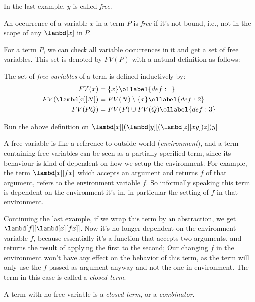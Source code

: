 \documentclass[../../../include/open-logic-section]{subfiles}
\begin{document}
In the last example, $y$ is called \emph{free}. 
\begin{defn}
  An occurrence of a variable $x$ in a term $P$ is \emph{free} if it's not bound, i.e., not in the scope of any
  $\lambd[x]$ in $P$.
\end{defn}


For a term $P$, we can check all variable occurrences in it and get a set of free
variables. This set is denoted by $FV(P)$ with a natural definition
as follows:

\begin{defn} 
  The set of \emph{free variables} of a term is defined inductively by:
  \begin{align} 
    FV(x) &= \{x\} \ollabel{def:1} \\
    FV(\lambd[x][N]) &= FV(N) \setminus \{x\}    \ollabel{def:2} \\
    FV(PQ) &= FV(P) \cup FV(Q) \ollabel{def:3}
  \end{align}
\end{defn}

\begin{prob}
  Run the above definition on $\lambd[x][(\lambd[y][(\lambd[z][x y]) z]) y]$
\end{prob}

\begin{explain}
A free variable is like a reference to outside world (\emph{environment}), and a term
containing free variables can be seen as a partially specified term,
since its behaviour is kind of dependent on how we setup the
environment. For example, the term $\lambd[x][f x]$ which
accepts an argument and returns $f$ of that argument, refers to the environment variable
$f$. So informally speaking this term is dependent on the environment
it's in, in particular the setting of $f$ in that environment.

Continuing the last example, if we wrap this term by an abstraction, we get
$\lambd[f][\lambd[x][f x]]$. Now it's no longer dependent on
the environment variable $f$, because essentially it's a function that
accepts two arguments, and returns the result of applying the first to
the second; Our changing $f$ in the environment won't have any
effect on the behavior of this term, as the term will only use the $f$
passed as argument anyway and not the one in environment. The term
in this case is called a \emph{closed term}.
\end{explain}

\begin{defn}
  A term with no free variable is a \emph{closed term}, or a \emph{combinator}.
\end{defn}
\end{document}
